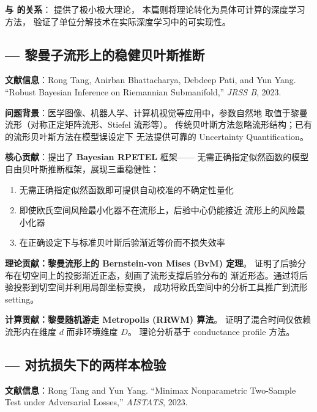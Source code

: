 \documentclass[12pt]{amsbook}
\theoremstyle{plain}
\begin{document}
\textbf{与 \citep{tang2022minimax} 的关系}：\citep{tang2022minimax} 提供了极小极大理论，
本篇则将理论转化为具体可计算的深度学习方法，
验证了单位分解技术在实际深度学习中的可实现性。

\subsection{\citep{tang2023robust} --- 黎曼子流形上的稳健贝叶斯推断}
\label{sec:tang-jrssb2023}

\textbf{文献信息}：Rong Tang, Anirban Bhattacharya, Debdeep Pati,
and Yun Yang. ``Robust Bayesian Inference on Riemannian Submanifold,''
\textit{JRSS B}, 2023.

\textbf{问题背景}：医学图像、机器人学、计算机视觉等应用中，参数自然地
取值于黎曼流形（对称正定矩阵流形、Stiefel 流形等）。
传统贝叶斯方法忽略流形结构；已有的流形贝叶斯方法在模型误设定下
无法提供可靠的 Uncertainty Quantification。

\textbf{核心贡献}：提出了 \textbf{Bayesian RPETEL} 框架——
无需正确指定似然函数的模型自由贝叶斯推断框架，展现三重稳健性：
\begin{enumerate}
    \item 无需正确指定似然函数即可提供自动校准的不确定性量化
    \item 即使欧氏空间风险最小化器不在流形上，后验中心仍能接近
          流形上的风险最小化器
    \item 在正确设定下与标准贝叶斯后验渐近等价而不损失效率
\end{enumerate}

\textbf{理论贡献：黎曼流形上的 Bernstein-von Mises (BvM) 定理}。
证明了后验分布在切空间上的投影渐近正态，刻画了流形支撑后验分布的
渐近形态。通过将后验投影到切空间并利用局部坐标变换，
成功将欧氏空间中的分析工具推广到流形 setting。

\textbf{计算贡献：黎曼随机游走 Metropolis (RRWM) 算法}。
证明了混合时间仅依赖流形内在维度 $d$ 而非环境维度 $D$。
理论分析基于 conductance profile 方法。

\subsection{\citep{tang2023twosample} --- 对抗损失下的两样本检验}
\label{sec:tang-aistats2023}

\textbf{文献信息}：Rong Tang and Yun Yang.
``Minimax Nonparametric Two-Sample Test under Adversarial Losses,''
\textit{AISTATS}, 2023.
\end{document}
